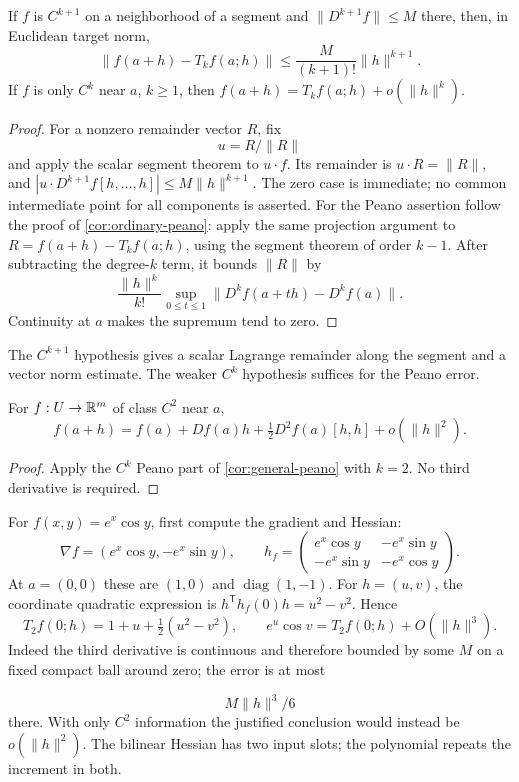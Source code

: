 \begin{corollary}\label{cor:general-peano}
If $f$ is $C^{k+1}$ on a neighborhood of a segment and $\|D^{k+1}f\|\leq M$ there,
then, in Euclidean target norm,
\[
\|f(a+h)-T_kf(a;h)\|\leq\frac{M}{(k+1)!}\|h\|^{k+1}.
\]
If $f$ is only $C^k$ near $a$, $k\geq1$, then
$f(a+h)=T_kf(a;h)+o(\|h\|^k)$.
\end{corollary}
\begin{proof}
For a nonzero remainder vector $R$, fix
\[
u=R/\|R\|
\]
 and apply the
scalar segment theorem to $u\cdot f$. Its remainder is $u\cdot R=\|R\|$,
and $|u\cdot D^{k+1}f[h,\ldots,h]|\leq M\|h\|^{k+1}$.
The zero case is immediate; no common intermediate point for all
components is asserted.
For the Peano assertion follow the proof of \cref{cor:ordinary-peano}:
apply the same projection argument to
$R=f(a+h)-T_kf(a;h)$, using the segment theorem of order $k-1$.
After subtracting the degree-$k$ term, it bounds $\|R\|$ by
\[
\frac{\|h\|^k}{k!}\sup_{0\leq t\leq1}
\|D^kf(a+th)-D^kf(a)\|.
\]
Continuity at $a$ makes the supremum tend to zero.
\end{proof}
The $C^{k+1}$ hypothesis gives a scalar Lagrange remainder along the
segment and a vector norm estimate. The weaker $C^k$ hypothesis suffices
for the Peano error.


\begin{corollary}
\label{cor:second-peano}
For $f:U\to\mathbb{R}^m$ of class $C^2$ near $a$,
\[
f(a+h)=f(a)+Df(a)h+\tfrac12D^2f(a)[h,h]+o(\|h\|^2).
\]
\end{corollary}
\begin{proof}
Apply the $C^k$ Peano part of \cref{cor:general-peano} with $k=2$. No third derivative is required.
\end{proof}
\begin{example}
For $f(x,y)=e^x\cos y$, first compute the gradient and Hessian:
\[
\nabla f=(e^x\cos y,-e^x\sin y),\qquad
h_f=\begin{pmatrix}e^x\cos y&-e^x\sin y\\-e^x\sin y&-e^x\cos y\end{pmatrix}.
\]
At $a=(0,0)$ these are $(1,0)$ and $\operatorname{diag}(1,-1)$.
For $h=(u,v)$, the coordinate quadratic expression is
$h^{\mathsf T}h_f(0)h=u^2-v^2$. Hence
\[
T_2f(0;h)=1+u+\tfrac12(u^2-v^2),\qquad
e^u\cos v=T_2f(0;h)+O(\|h\|^3).
\]
Indeed the third derivative is continuous and therefore bounded by some
$M$ on a fixed compact ball around zero; the error is at most

\[
M\|h\|^3/6
\]
 there. With only $C^2$ information the justified conclusion
would instead be $o(\|h\|^2)$. The bilinear Hessian has two input slots;
the polynomial repeats the increment in both.
\end{example}

